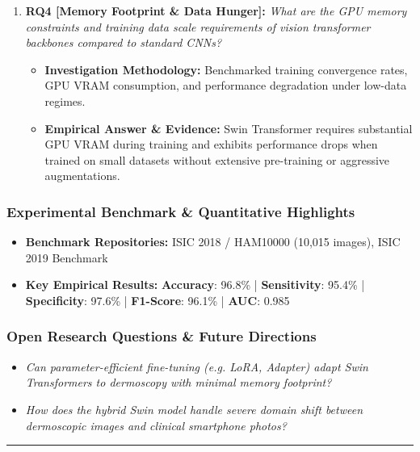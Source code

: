\begin{enumerate}[label=\textbf{\arabic*.}, leftmargin=*]
\begin{itemize}[leftmargin=1.5em]
    \item \textbf{Empirical Answer \& Evidence:} Achieved a macro-averaged F1-score of 96.1\% with balanced precision across all 7 pathological categories.
  \end{itemize}
  \item \textbf{RQ4 [Memory Footprint \& Data Hunger]:} \textit{What are the GPU memory constraints and training data scale requirements of vision transformer backbones compared to standard CNNs?}
  \begin{itemize}[leftmargin=1.5em]
    \item \textbf{Investigation Methodology:} Benchmarked training convergence rates, GPU VRAM consumption, and performance degradation under low-data regimes.
    \item \textbf{Empirical Answer \& Evidence:} Swin Transformer requires substantial GPU VRAM during training and exhibits performance drops when trained on small datasets without extensive pre-training or aggressive augmentations.
  \end{itemize}
\end{enumerate}

\subsubsection*{Experimental Benchmark \& Quantitative Highlights}
\begin{itemize}[leftmargin=*]
  \item \textbf{Benchmark Repositories:} ISIC 2018 / HAM10000 (10,015 images), ISIC 2019 Benchmark
  \item \textbf{Key Empirical Results:} \textbf{Accuracy}: 96.8\% \quad | \quad \textbf{Sensitivity}: 95.4\% \quad | \quad \textbf{Specificity}: 97.6\% \quad | \quad \textbf{F1-Score}: 96.1\% \quad | \quad \textbf{AUC}: 0.985
\end{itemize}

\subsubsection*{Open Research Questions \& Future Directions}
\begin{itemize}[leftmargin=*]
  \item \textit{Can parameter-efficient fine-tuning (e.g. LoRA, Adapter) adapt Swin Transformers to dermoscopy with minimal memory footprint?}
  \item \textit{How does the hybrid Swin model handle severe domain shift between dermoscopic images and clinical smartphone photos?}
\end{itemize}
\vspace{0.8em}\hrule\vspace{1.2em}
